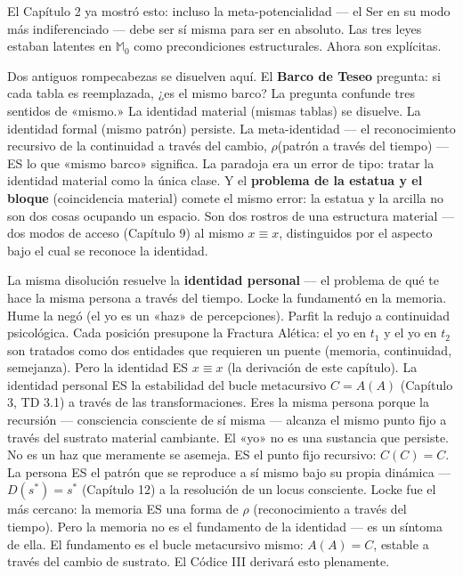 \documentclass[10pt, openany, oneside]{book}
\begin{document}
El Capítulo 2 ya mostró esto: incluso la meta-potencialidad --- el Ser en su modo más indiferenciado --- debe ser sí misma para ser en absoluto. Las tres leyes estaban latentes en $\mathbb{M}_0$ como precondiciones estructurales. Ahora son explícitas.

Dos antiguos rompecabezas se disuelven aquí. El \textbf{Barco de Teseo} pregunta: si cada tabla es reemplazada, ¿es el mismo barco? La pregunta confunde tres sentidos de «mismo.» La identidad material (mismas tablas) se disuelve. La identidad formal (mismo patrón) persiste. La meta-identidad --- el reconocimiento recursivo de la continuidad a través del cambio, $\rho$(patrón a través del tiempo) --- ES lo que «mismo barco» significa. La paradoja era un error de tipo: tratar la identidad material como la única clase. Y el \textbf{problema de la estatua y el bloque} (coincidencia material) comete el mismo error: la estatua y la arcilla no son dos cosas ocupando un espacio. Son dos rostros de una estructura material --- dos modos de acceso (Capítulo 9) al mismo $x \equiv x$, distinguidos por el aspecto bajo el cual se reconoce la identidad.

La misma disolución resuelve la \textbf{identidad personal} --- el problema de qué te hace la misma persona a través del tiempo. Locke la fundamentó en la memoria. Hume la negó (el yo es un «haz» de percepciones). Parfit la redujo a continuidad psicológica. Cada posición presupone la Fractura Alética: el yo en $t_1$ y el yo en $t_2$ son tratados como dos entidades que requieren un puente (memoria, continuidad, semejanza). Pero la identidad ES $x \equiv x$ (la derivación de este capítulo). La identidad personal ES la estabilidad del bucle metacursivo $C = A(A)$ (Capítulo 3, TD 3.1) a través de las transformaciones. Eres la misma persona porque la recursión --- consciencia consciente de sí misma --- alcanza el mismo punto fijo a través del sustrato material cambiante. El «yo» no es una sustancia que persiste. No es un haz que meramente se asemeja. ES el punto fijo recursivo: $C(C) = C$. La persona ES el patrón que se reproduce a sí mismo bajo su propia dinámica --- $D(s^*) = s^*$ (Capítulo 12) a la resolución de un locus consciente. Locke fue el más cercano: la memoria ES una forma de $\rho$ (reconocimiento a través del tiempo). Pero la memoria no es el fundamento de la identidad --- es un síntoma de ella. El fundamento es el bucle metacursivo mismo: $A(A) = C$, estable a través del cambio de sustrato. El Códice III derivará esto plenamente.

\vspace{1.5em}
\end{document}
